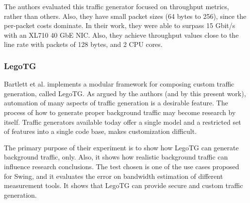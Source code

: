 The authors evaluated this traffic generator focused on throughput metrics, rather than others. Also, they have small packet sizes (64 bytes to 256), since the per-packet costs dominate. In their work, they were able to surpass 15 Gbit/s with an XL710 40 GbE NIC. Also, they achieve throughput values close to the line rate with packets of 128 bytes, and 2 CPU cores. 


\subsubsection{LegoTG}

Bartlett et al.\cite{legotg-paper} implements a modular framework for composing custom traffic generation, called LegoTG. As argued by the authors (and by this present work), automation of many aspects of traffic generation is a desirable feature. The process of how to generate proper background traffic may become research by itself. Traffic generators available today offer a single model and a restricted set of features into a single code base, makes customization difficult. 

The primary purpose of their experiment is to show how LegoTG can generate background traffic, only. Also, it shows how realistic background traffic can influence research conclusions. The test chosen is one of the use cases proposed for Swing\cite{background-traffic-matter}, and it evaluates the error on bandwidth estimation of different measurement tools. It shows that LegoTG can provide secure and custom traffic generation.




